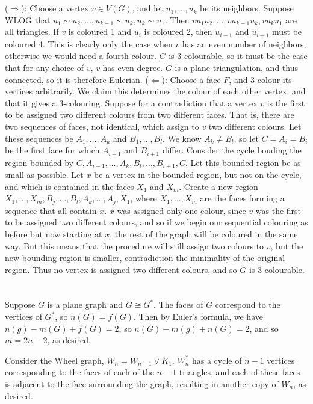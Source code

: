 \documentclass[11pt]{article}
\begin{document}
\section{} %
($\Longrightarrow$): Choose a vertex $v\in V(G)$, and let $u_1,\ldots,u_k$ be
its neighbors. Suppose WLOG that $u_1\sim u_2,\ldots,u_{k-1}\sim u_k,u_k\sim
u_1$. Then $vu_1u_2,\ldots,vu_{k-1}u_k,vu_ku_1$ are all triangles. If $v$ is
coloured 1 and $u_i$ is coloured 2, then $u_{i-1}$ and $u_{i+1}$ must be
coloured 4. This is clearly only the case when $v$ has an even number of
neighbors, otherwise we would need a fourth colour. $G$ is 3-colourable, so it
must be the case that for any choice of $v$, $v$ has even degree. $G$ is a
plane triangulation, and thus connected, so it is therefore Eulerian.
\newline
\newline
($\Longleftarrow$): Choose a face $F$, and 3-colour its vertices arbitrarily.
We claim this determines the colour of each other vertex, and that it gives a
3-colouring. Suppose for a contradiction that a vertex $v$ is the first to be
assigned two different colours from two different faces. That is, there are
two sequences of faces, not identical, which assign to $v$ two different
colours. Let these sequences be $A_1,\ldots,A_k$ and $B_1,\ldots,B_l$. We know
$A_k\neq B_l$, so let $C=A_i=B_i$ be the first face for which $A_{i+1}$ and
$B_{i+1}$ differ. Consider the cycle bouding the region bounded by
$C,A_{i+1},\ldots,A_k,B_l,\ldots,B_{i+1},C$. Let this bounded region be as
small as possible. Let $x$ be a vertex in the bounded region, but not on the
cycle, and which is contained in the faces $X_1$ and $X_m$. Create a new
region $X_1,\ldots,X_m,B_j,\ldots,B_l,A_k,\ldots,A_j,X_1$, where
$X_1,\ldots,X_m$ are the faces forming a sequence that all contain $x$. $x$
was assigned only one colour, since $v$ was the first to be assigned two
different colours, and so if we begin our sequential colouring as before but
now starting at $x$, the rest of the graph will be coloured in the same way.
But this means that the procedure will still assign two colours to $v$, but
the new bounding region is smaller, contradiction the minimality of the
original region. Thus no vertex is assigned two different colours, and so $G$
is 3-colourable.


\section{} %
Suppose $G$ is a plane graph and $G\cong G^*$. The faces of $G$ correspond to
the vertices of $G^*$, so $n(G)=f(G)$. Then by Euler's formula, we have
$n(g)-m(G)+f(G)=2$, so $n(G)-m(g)+n(G)=2$, and so $m=2n-2$, as desired.

Consider the Wheel graph, $W_n=W_{n-1}\lor K_1$. $W_n^*$ has a cycle of $n-1$
vertices corresponding to the faces of each of the $n-1$ triangles, and each
of these faces is adjacent to the face surrounding the graph, resulting in
another copy of $W_n$, as desired.
\end{document}
